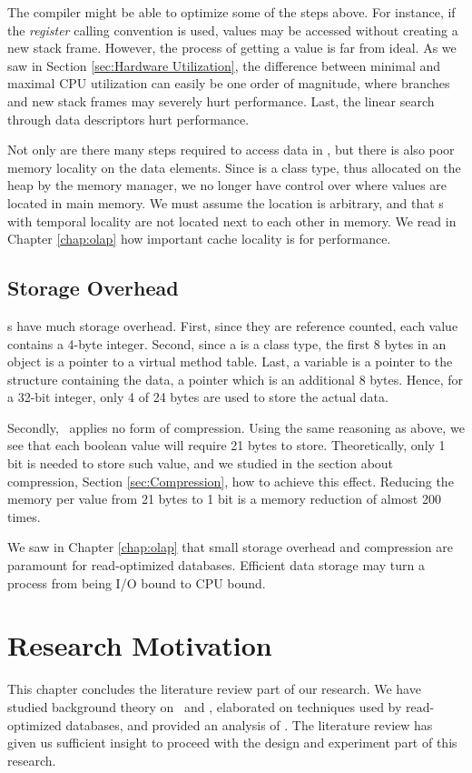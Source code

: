 The compiler might be able to optimize some of the steps above. For instance, if the \textit{register} calling convention is used, values may be accessed without creating a new stack frame. However, the process of getting a value is far from ideal. As we saw in Section \ref{sec:Hardware Utilization}, the difference between minimal and maximal CPU utilization can easily be one order of magnitude, where branches and new stack frames may severely hurt performance. Last, the linear search through data descriptors hurt performance.

Not only are there many steps required to access data in \gap, but there is also poor memory locality on the data elements. Since  is a class type, thus allocated on the heap by the memory manager, we no longer have control over where values are located in main memory. We must assume the location is arbitrary, and that s with temporal locality are not located next to each other in memory. We read in Chapter \ref{chap:olap} how important cache locality is for performance.

\subsection{Storage Overhead}
\label{sub:Storage Overhead}
s have much storage overhead. First, since they are reference counted, each value contains a 4-byte integer. Second, since a  is a class type, the first 8 bytes in an object is a pointer to a virtual method table. Last, a  variable is a pointer to the structure containing the data, a pointer which is an additional 8 bytes. Hence, for a 32-bit integer, only 4 of 24 bytes are used to store the actual data. 

Secondly, \gap~applies no form of compression. Using the same reasoning as above, we see that each boolean value will require 21 bytes to store. Theoretically, only 1 bit is needed to store such value, and we studied in the section about compression, Section \ref{sec:Compression}, how to achieve this effect. Reducing the memory per value from 21 bytes to 1 bit is a memory reduction of almost 200 times.

We saw in Chapter \ref{chap:olap} that small storage overhead and compression are paramount for read-optimized databases. Efficient data storage may turn a process from being I/O bound to CPU bound.

\section{Research Motivation}
\label{sec:Research Motivation}
This chapter concludes the literature review part of our research. We have studied background theory on \mde~and \bi, elaborated on techniques used by read-optimized databases, and provided an analysis of \gap. The literature review has given us sufficient insight to proceed with the design and experiment part of this research. 

